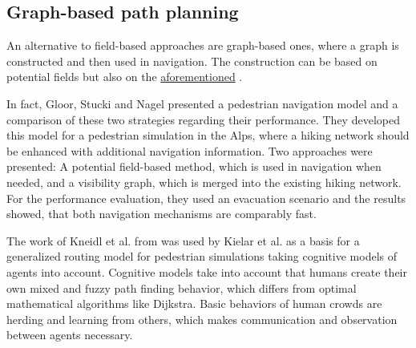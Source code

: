 	\subsection{Graph-based path planning}
	
		An alternative to field-based approaches are graph-based ones, where a graph is constructed and then used in navigation.
		The construction can be based on potential fields but also on the \hyperref[subsec:related-work:visibility-graph]{aforementioned} .
		
		In fact, Gloor, Stucki and Nagel presented a pedestrian navigation model and a comparison of these two strategies regarding their performance\cite{gloor-hybrid-pedestrian-routing}.
		They developed this model for a pedestrian simulation in the Alps, where a hiking network should be enhanced with additional navigation information.
		Two approaches were presented: A potential field-based method, which is used in navigation when needed, and a visibility graph, which is merged into the existing hiking network.
		For the performance evaluation, they used an evacuation scenario and the results showed, that both navigation mechanisms are comparably fast.
		
		The work of Kneidl et al. from  was used by Kielar et al. as a basis for a generalized routing model for pedestrian simulations\cite{kielar-unified-pedestrian-routing} taking cognitive models of agents into account.
		Cognitive models take into account that humans create their own mixed and fuzzy path finding behavior, which differs from optimal mathematical algorithms like Dijkstra.
		Basic behaviors of human crowds are herding and learning from others, which makes communication and observation between agents necessary.
		
		